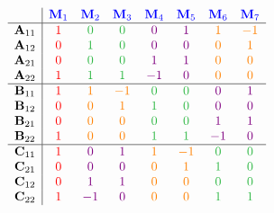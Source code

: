 \begin{multicols}{2}
        \setlength{\arraycolsep}{3pt}
        \[\begin{array}{c|ccccccc}
                & \color{blue} \mathbf{M}_1 & \color{blue} \mathbf{M}_2 & \color{blue} \mathbf{M}_3 & \color{blue} \mathbf{M}_4 & \color{blue} \mathbf{M}_5 & \color{blue} \mathbf{M}_6 & \color{blue} \mathbf{M}_7 \\
                \hline
                \mathbf{A}_{11} & \color{red} 1 & \color{mycustomgreen} 0 & \color{mycustomgreen} 0 & \color{violet} 0 & \color{violet} 1 & \color{orange} 1 & \color{orange} -1 \\
                \mathbf{A}_{12} & \color{red} 0 & \color{mycustomgreen} 1 & \color{mycustomgreen} 0 & \color{violet} 0 & \color{violet} 0 & \color{orange} 0 & \color{orange} 1 \\
                \mathbf{A}_{21} & \color{red} 0 & \color{mycustomgreen} 0 & \color{mycustomgreen} 0 & \color{violet} 1 & \color{violet} 1 & \color{orange} 0 & \color{orange} 0 \\
                \mathbf{A}_{22} & \color{red} 1 & \color{mycustomgreen} 1 & \color{mycustomgreen} 1 & \color{violet} -1 & \color{violet} 0 & \color{orange} 0 & \color{orange} 0 \\
                \hline
                \mathbf{B}_{11} & \color{red} 1 & \color{orange} 1 & \color{orange} -1 & \color{mycustomgreen} 0 & \color{mycustomgreen} 0 & \color{violet} 0 & \color{violet} 1 \\
                \mathbf{B}_{12} & \color{red} 0 & \color{orange} 0 & \color{orange} 1 & \color{mycustomgreen} 1 & \color{mycustomgreen} 0 & \color{violet} 0 & \color{violet} 0 \\
                \mathbf{B}_{21} & \color{red} 0 & \color{orange} 0 & \color{orange} 0 & \color{mycustomgreen} 0 & \color{mycustomgreen} 0 & \color{violet} 1 & \color{violet} 1 \\
                \mathbf{B}_{22} & \color{red} 1 & \color{orange} 0 & \color{orange} 0 & \color{mycustomgreen} 1 & \color{mycustomgreen} 1 & \color{violet} -1 & \color{violet} 0 \\
                \hline
                \mathbf{C}_{11} & \color{red} 1 & \color{violet} 0 & \color{violet} 1 & \color{orange} 1 & \color{orange} -1 & \color{mycustomgreen} 0 & \color{mycustomgreen} 0 \\
                \mathbf{C}_{21} & \color{red} 0 & \color{violet} 0 & \color{violet} 0 & \color{orange} 0 & \color{orange} 1 & \color{mycustomgreen} 1 & \color{mycustomgreen} 0 \\
                \mathbf{C}_{12} & \color{red} 0 & \color{violet} 1 & \color{violet} 1 & \color{orange} 0 & \color{orange} 0 & \color{mycustomgreen} 0 & \color{mycustomgreen} 0 \\
                \mathbf{C}_{22} & \color{red} 1 & \color{violet} -1 & \color{violet} 0 & \color{orange} 0 & \color{orange} 0 & \color{mycustomgreen} 1 & \color{mycustomgreen} 1 \\
        \end{array}\]
    \end{multicols}

